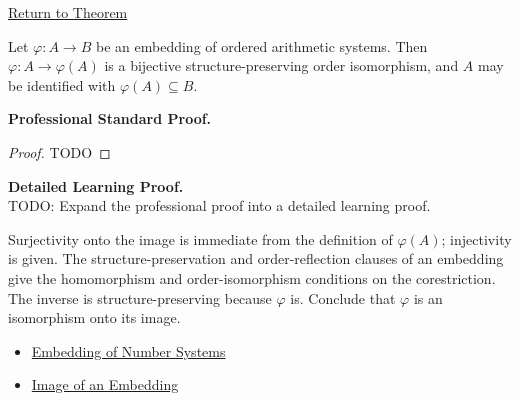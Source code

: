 \newpage
{}
\label{prf:embedding-identifies-with-image}

\begin{remark*}[Return]
\hyperref[thm:embedding-identifies-with-image]{Return to Theorem}
\end{remark*}

\begin{theorem*}
Let $\varphi:A\to B$ be an embedding of ordered arithmetic systems. Then $\varphi:A\to\varphi(A)$ is a bijective structure-preserving order isomorphism, and $A$ may be identified with $\varphi(A)\subseteq B$.
\end{theorem*}

\textbf{Professional Standard Proof.}~\\
\begin{proof}
TODO
\end{proof}

\textbf{Detailed Learning Proof.}~\\
TODO: Expand the professional proof into a detailed learning proof.

\begin{remark*}
Surjectivity onto the image is immediate from the definition of $\varphi(A)$; injectivity is given. The structure-preservation and order-reflection clauses of an embedding give the homomorphism and order-isomorphism conditions on the corestriction. The inverse is structure-preserving because $\varphi$ is. Conclude that $\varphi$ is an isomorphism onto its image.
\end{remark*}

\begin{dependencies}
\begin{itemize}
  \item \hyperref[def:number-system-embedding]{Embedding of Number Systems}
  \item \hyperref[def:image-of-embedding]{Image of an Embedding}
\end{itemize}
\end{dependencies}

